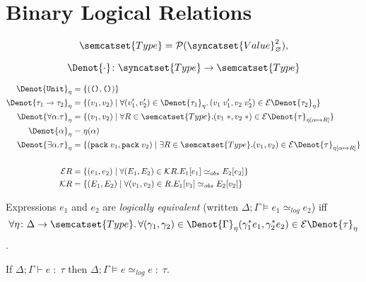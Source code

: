 \section{Binary Logical Relations}
\[
  \semcatset{Type} = \mathcal{P}(\syncatset{Value}_{\varnothing}^2),
\]

\[
  \Denot{\cdot} \colon \syncatset{Type} \to \semcatset{Type}
\]

\begin{alignat*}{2}
  \Denot{\texttt{Unit}}_{\eta} & = \{ (\texttt{()}, \texttt{()}) \} \\
  \Denot{\tau_1 \to \tau_2}_{\eta} & = \{ (v_1, v_2) \mid
    \forall (v_1', v_2') \in \Denot{\tau_1}_{\eta}\ldotp
    (v_1\;v_1', v_2\;v_2' ) \in \mathcal{E}\Denot{\tau_2}_{\eta} \} \\
  \Denot{\forall\alpha.\tau}_{\eta} & = \{ (v_1, v_2) \mid \forall R \in \semcatset{Type}.
    (v_1\;*, v_2\;*) \in \mathcal{E}\Denot{\tau}_{\eta[\alpha \mapsto R]} \} \\
  \Denot{\alpha}_{\eta} & = \eta(\alpha) \\
  \Denot{\exists\alpha.\tau}_{\eta} & =
    \{ (\texttt{pack}\;v_1,\texttt{pack}\;v_2) \mid \exists R \in \semcatset{Type}.
    (v_1, v_2) \in \mathcal{E}\Denot{\tau}_{\eta[\alpha \mapsto R]} \} \\\\
  \mathcal{E}R & = \{ (e_1, e_2) \mid \forall (E_1, E_2) \in \mathcal{K} R. E_1[e_1] \simeq_{obs}  E_2[e_2]\}\\
  \mathcal{K}R & = \{ (E_1, E_2) \mid \forall (v_1, v_2) \in R. E_1[v_1] \simeq_{obs}  E_2[v_2]\}\\
\end{alignat*}


\begin{defin}
  Expressions $e_1$ and $e_2$ are \emph{logically equivalent}
  (written $\Delta; \Gamma \models e_1 \simeq_{log} e_2$)
  iff
  \[
    \forall \eta \colon \Delta \to \semcatset{Type}\ldotp
    \forall (\gamma_1, \gamma_2) \in \Denot{\Gamma}_{\eta} \\
    (\gamma_1^*e_1, \gamma_2^*e_2) \in \mathcal{E}\Denot{\tau}_{\eta}
  \].
\end{defin}

\begin{theorem}
  If $\Delta; \Gamma \vdash e \;:\; \tau$ then $\Delta; \Gamma \models e \simeq_{log} e \;:\; \tau$.
\end{theorem}

